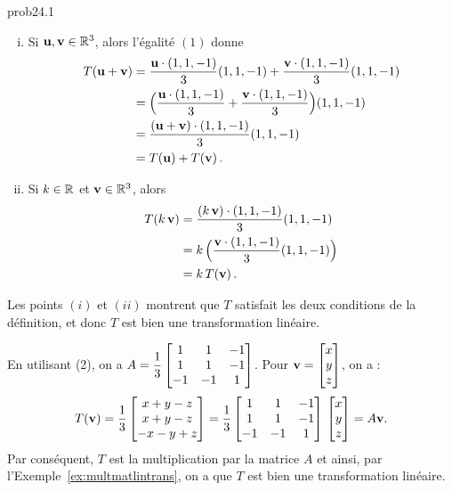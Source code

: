 \begin{sol}{prob24.1}
\begin{enumerate}[]
\smallskip
\begin{enumerate}[(i)]
\item Si $\mathbf{u}, \mathbf{v} \in \mathbb{R}^3$, alors l'égalité $(1)$ donne 
\begin{equation*}
\begin{split}
 T(\mathbf{u}+\mathbf{v}) &=\frac{\mathbf{u}\cdot (1,1,-1)}{3}(1,1,-1)+ \frac{\mathbf{v}\cdot (1,1,-1)}{3}(1,1,-1) \\
  &= \Big( \frac{\mathbf{u}\cdot (1,1,-1)}{3}+ \frac{\mathbf{v}\cdot (1,1,-1)}{3}\Big)(1,1,-1)\\
  &= \frac{(\mathbf{u}+\mathbf{v})\cdot (1,1,-1)}{3}(1,1,-1)\\
  &= T(\mathbf{u})+T(\mathbf{v})\,.\\
\end{split}\end{equation*}
\item Si $k\in \mathbb{R}$ et $\mathbf{v}\in \mathbb{R}^3$, alors
 \begin{equation*}
\begin{split}
 T(k\,\mathbf{v}) &=\frac{(k\,\mathbf{v})\cdot (1,1,-1)}{3}(1,1,-1) \\
  &= k\,\Big( \frac{ \mathbf{v}\cdot (1,1,-1)}{3}(1,1,-1)\Big)\\
  &= k\,T(\mathbf{v})\,.\\
\end{split}\end{equation*}
\end{enumerate}
Les points $(i)$ et $(ii)$ montrent que $T$ satisfait les deux conditions de la définition, et donc $T$ est bien une transformation linéaire.

\medskip
{}

En utilisant (2), on a $A= \dfrac13\bmatrix
 1& 1& -1\\
 1& 1& -1\\ 
-1& -1& 1\endbmatrix$. Pour $\vv=\bmatrix x\\y\\z\endbmatrix$, on a :
$$T(\vv)= \frac13\bmatrix x+y-z\\x+y-z\\-x-y+z\endbmatrix= \frac13\bmatrix
 1& 1& -1\\
 1& 1& -1\\ 
-1& -1& 1\endbmatrix \, \bmatrix x\\y\\z\endbmatrix= A \vv.$$
Par conséquent, $T$ est la multiplication par la matrice $A$ et ainsi, par l'Exemple~\ref{ex:multmatlintrans}, on a que $T$ est bien une transformation linéaire.
\medskip



\end{enumerate}
\end{sol}
